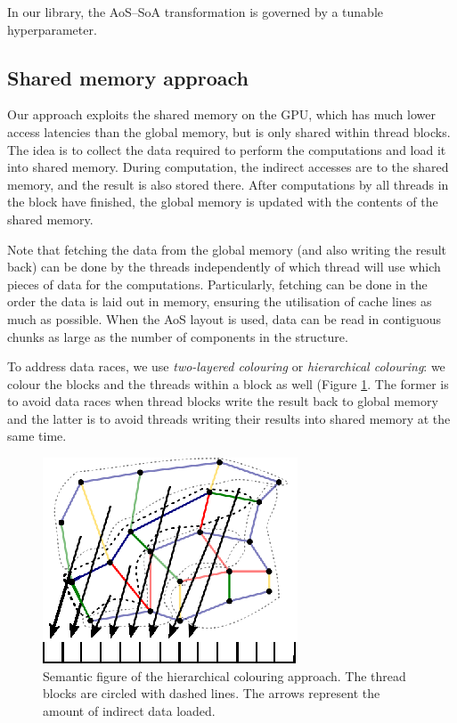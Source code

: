 In our library, the AoS--SoA transformation is governed by a tunable
hyperparameter.

\subsection{Shared memory approach}\label{shared-memory-approach}

Our approach exploits the shared memory on the GPU, which has much lower access
latencies than the global memory, but is only shared within thread blocks. The
idea is to collect the data required to perform the computations and load it
into shared memory. During computation, the indirect accesses are to the shared
memory, and the result is also stored there. After computations by all threads
in the block have finished, the global memory is updated with the contents of
the shared memory.

Note that fetching the data from the global memory (and also writing the result
back) can be done by the threads independently of which thread will use which
pieces of data for the computations. Particularly, fetching can be done in the
order the data is laid out in memory, ensuring the utilisation of cache lines as
much as possible. When the AoS layout is used, data can be read in contiguous
chunks as large as the number of components in the structure.

To address data races, we use \emph{two-layered colouring} or \emph{hierarchical
colouring}\cite{op2}: we colour the blocks and the threads within a block as
well (Figure \ref{fig:unstructured_hier}. The former is to avoid data
races when thread blocks write the result back to global memory and the latter
is to avoid threads writing their results into shared memory at the same time.

\begin{figure}[Htpb]
  \centering
  \includegraphics{fig/svg/unstructured_hier.eps}
  \caption{Semantic figure of the hierarchical colouring approach. The thread
  blocks are circled with dashed lines. The arrows represent the amount of
  indirect data loaded.}
  \label{fig:unstructured_hier}
\end{figure}

